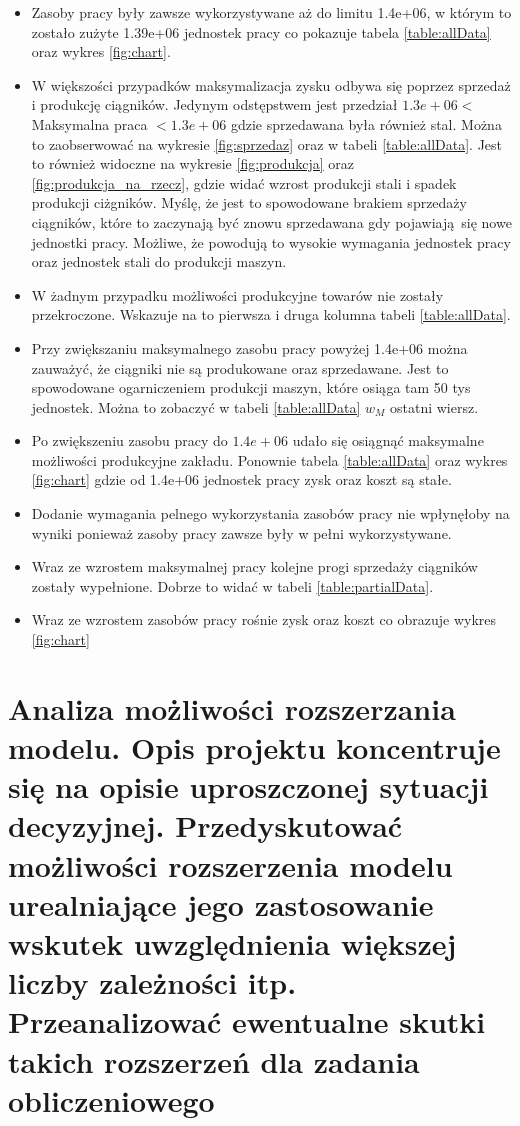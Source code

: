 \documentclass{article}
\begin{document}
\begin{itemize}
  \item Zasoby pracy były zawsze wykorzystywane aż do limitu 1.4e+06, w którym to zostało zużyte 1.39e+06 jednostek pracy co pokazuje tabela \ref{table:allData} oraz wykres \ref{fig:chart}.
  \item W większości przypadków maksymalizacja zysku odbywa się poprzez sprzedaż i produkcję ciągników. Jedynym odstępstwem jest przedział $1.3e+06 < $ Maksymalna praca $ < 1.3e+06$ gdzie sprzedawana była również stal. 
    Można to zaobserwować na wykresie \ref{fig:sprzedaz} oraz w tabeli \ref{table:allData}. Jest to również widoczne na wykresie \ref{fig:produkcja} oraz \ref{fig:produkcja_na_rzecz}, gdzie widać wzrost produkcji stali i spadek produkcji ciżgników. Myślę, że jest to spowodowane brakiem sprzedaży ciągników, które to zaczynają być znowu sprzedawana gdy pojawiają się nowe jednostki pracy. Możliwe, że powodują to wysokie wymagania jednostek pracy oraz jednostek stali do produkcji maszyn. 
  \item W żadnym przypadku możliwości produkcyjne towarów nie zostały przekroczone. Wskazuje na to pierwsza i druga kolumna tabeli \ref{table:allData}.
  \item Przy zwiększaniu maksymalnego zasobu pracy powyżej 1.4e+06 można zauważyć, że ciągniki nie są produkowane oraz sprzedawane. Jest to spowodowane ogarniczeniem produkcji maszyn, które osiąga tam 50 tys jednostek. Można to zobaczyć w tabeli \ref{table:allData} $w_M$ ostatni wiersz.
  \item Po zwiększeniu zasobu pracy do $1.4e+06$ udało się osiągnąć maksymalne możliwości produkcyjne zakładu. Ponownie tabela \ref{table:allData} oraz wykres \ref{fig:chart} gdzie od 1.4e+06 jednostek pracy zysk oraz koszt są stałe.
  \item Dodanie wymagania pelnego wykorzystania zasobów pracy nie wpłynęłoby na wyniki ponieważ zasoby pracy zawsze były w pełni wykorzystywane.
  \item Wraz ze wzrostem maksymalnej pracy kolejne progi sprzedaży ciągników zostały wypełnione. Dobrze to widać w tabeli \ref{table:partialData}.
  \item Wraz ze wzrostem zasobów pracy rośnie zysk oraz koszt co obrazuje wykres \ref{fig:chart}
\end{itemize}

\section{Analiza  możliwości  rozszerzania  modelu.  Opis  projektu  koncentruje  się  na  opisie uproszczonej  sytuacji  decyzyjnej.  Przedyskutować  możliwości  rozszerzenia  modelu urealniające  jego  zastosowanie  wskutek  uwzględnienia  większej  liczby  zależności  itp. Przeanalizować ewentualne skutki takich rozszerzeń dla zadania obliczeniowego}
\end{document}
